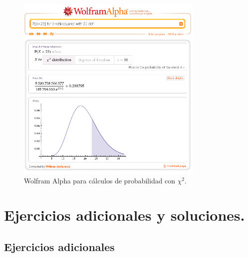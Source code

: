 \documentclass[10pt,a4paper]{article}\usepackage[]{graphicx}\usepackage[]{color}
\begin{document}
\begin{figure}[h!]
\begin{center}
    \includegraphics[width=9cm]{../fig/Tut07-03.png}
\end{center}
\caption{Wolfram Alpha para cálculos de probabilidad con $\chi^2$.}
\label{tut07:fig:ProbabilidadChiCuadradoWolframAlpha}
\end{figure}

\section{Ejercicios adicionales y soluciones.}
\label{tut07:sec:EjerciciosAdicionalesYSoluciones}

\subsection*{Ejercicios adicionales}
\label{tut07:subsec:EjerciciosAdicionales}

\end{document}
